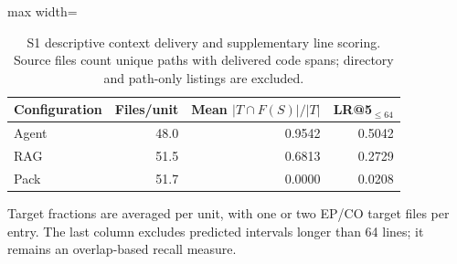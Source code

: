 \begin{table}[t]
\centering
\caption{S1 descriptive context delivery and supplementary line scoring. Source files count unique paths with delivered code spans; directory and path-only listings are excluded.}\label{tab:delivery}
\small
\begin{adjustbox}{max width=\columnwidth}\begin{tabular}{lrrr}
\toprule
Configuration & Files/unit & Mean $|T\cap F(S)|/|T|$ & LR@5$_{\leq64}$ \\
\midrule
Agent & 48.0 & 0.9542 & 0.5042 \\
RAG & 51.5 & 0.6813 & 0.2729 \\
Pack & 51.7 & 0.0000 & 0.0208 \\
\bottomrule
\end{tabular}\end{adjustbox}
\par\vspace{3pt}\begin{minipage}{\columnwidth}\footnotesize Target fractions are averaged per unit, with one or two EP/CO target files per entry. The last column excludes predicted intervals longer than 64 lines; it remains an overlap-based recall measure.\end{minipage}
\end{table}
